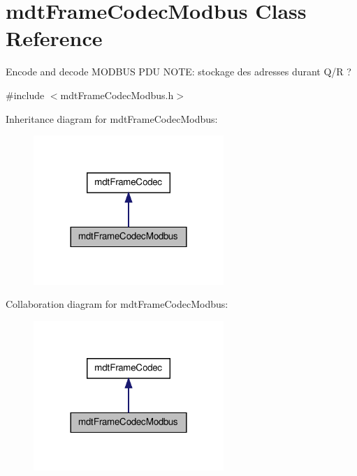 \hypertarget{classmdt_frame_codec_modbus}{
\section{mdtFrameCodecModbus Class Reference}
\label{classmdt_frame_codec_modbus}
}


Encode and decode MODBUS PDU NOTE: stockage des adresses durant Q/R ?  




{\ttfamily \#include $<$mdtFrameCodecModbus.h$>$}



Inheritance diagram for mdtFrameCodecModbus:\nopagebreak
\begin{figure}[H]
\begin{center}
\leavevmode
\includegraphics[width=204pt]{classmdt_frame_codec_modbus__inherit__graph}
\end{center}
\end{figure}


Collaboration diagram for mdtFrameCodecModbus:\nopagebreak
\begin{figure}[H]
\begin{center}
\leavevmode
\includegraphics[width=204pt]{classmdt_frame_codec_modbus__coll__graph}
\end{center}
\end{figure}
